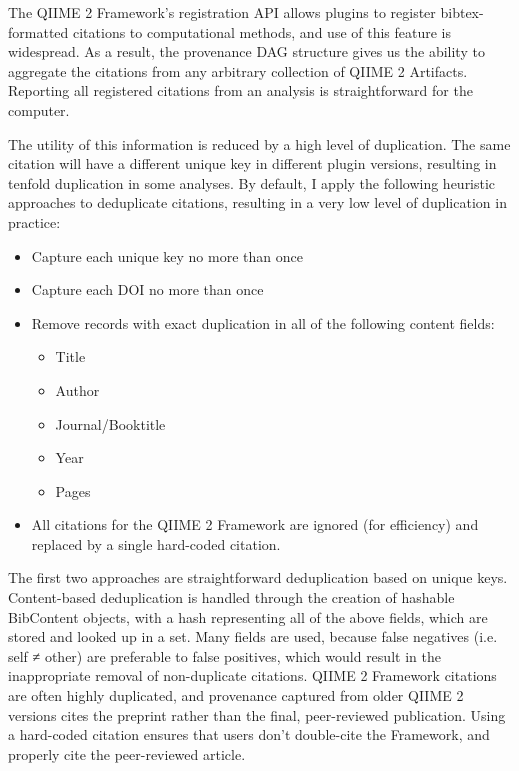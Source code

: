 The QIIME 2 Framework’s registration API allows plugins to register
bibtex-formatted citations to computational methods, and use of this feature is
widespread. As a result, the provenance DAG structure gives us the ability to
aggregate the citations from any arbitrary collection of QIIME 2 Artifacts.
Reporting all registered citations from an analysis is straightforward for the
computer.

The utility of this information is reduced by a high level of duplication. The
same citation will have a different unique key in different plugin versions,
resulting in tenfold duplication in some analyses. By default, I apply the
following heuristic approaches to deduplicate citations, resulting in a very low
level of duplication in practice:

\begin{itemize}
\item Capture each unique key no more than once
\item Capture each DOI no more than once
\item Remove records with exact duplication in all of the following content fields:
    \begin{itemize}
    \item Title
    \item Author
    \item Journal/Booktitle
    \item Year
    \item Pages
    \end{itemize}
\item All citations for the QIIME 2 Framework are ignored (for efficiency) and replaced by a single hard-coded citation.
\end{itemize}

The first two approaches are straightforward deduplication based on unique keys.
Content-based deduplication is handled through the creation of hashable
BibContent objects, with a hash representing all of the above fields, which are
stored and looked up in a set. Many fields are used, because false negatives
(i.e. self ≠ other) are preferable to false positives, which would result in
the inappropriate removal of non-duplicate citations.  QIIME 2 Framework
citations are often highly duplicated, and provenance captured from older
QIIME 2 versions cites the preprint rather than the final, peer-reviewed
publication. Using a hard-coded citation ensures that users don’t double-cite
the Framework, and properly cite the peer-reviewed article.


